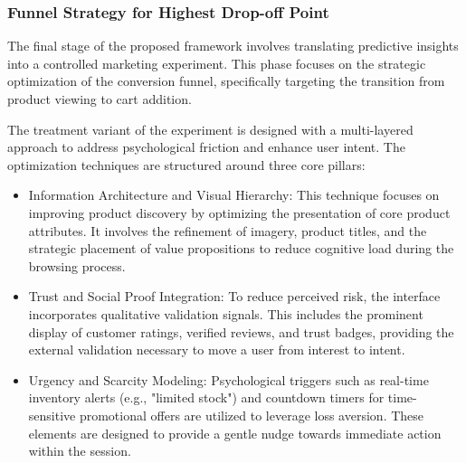 \documentclass[conference]{IEEEtran}
\begin{document}
\subsubsection{Funnel Strategy for Highest Drop-off Point}

\label{sec:funnel_strategy_highest_dropoff}
The final stage of the proposed framework involves translating predictive insights into a controlled marketing experiment. This phase focuses on the strategic optimization of the conversion funnel, specifically targeting the transition from product viewing to cart addition.

The treatment variant of the experiment is designed with a multi-layered approach to address psychological friction and enhance user intent. The optimization techniques are structured around three core pillars:
\begin{itemize}
    \item Information Architecture and Visual Hierarchy: This technique focuses on improving product discovery by optimizing the presentation of core product attributes. It involves the refinement of imagery, product titles, and the strategic placement of value propositions to reduce cognitive load during the browsing process.
    \item Trust and Social Proof Integration: To reduce perceived risk, the interface incorporates qualitative validation signals. This includes the prominent display of customer ratings, verified reviews, and trust badges, providing the external validation necessary to move a user from interest to intent.
    \item Urgency and Scarcity Modeling: Psychological triggers such as real-time inventory alerts (e.g., "limited stock") and countdown timers for time-sensitive promotional offers are utilized to leverage loss aversion. These elements are designed to provide a gentle nudge towards immediate action within the session.
\end{itemize}
\end{document}
